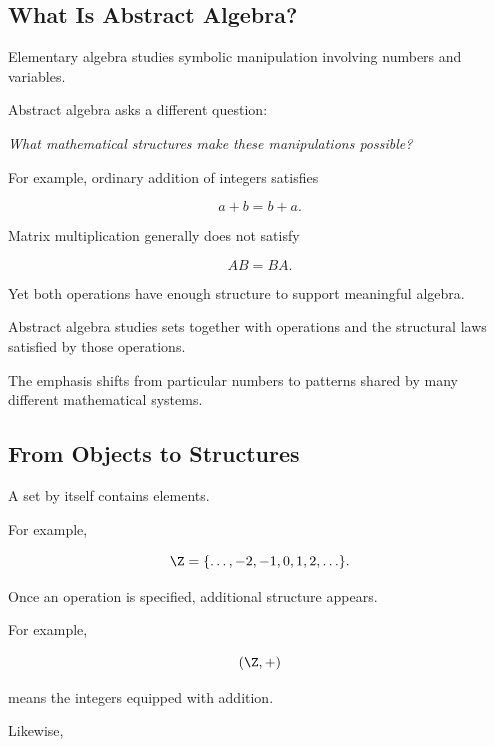 \subsection{What Is Abstract Algebra?}
\label{subsec:what-is-abstract-algebra}

Elementary algebra studies symbolic manipulation involving numbers and
variables.

Abstract algebra asks a different question:

\begin{center}
\emph{What mathematical structures make these manipulations possible?}
\end{center}

For example, ordinary addition of integers satisfies

\[ a+b=b+a. \]

Matrix multiplication generally does not satisfy

\[ AB=BA. \]

Yet both operations have enough structure to support meaningful algebra.

\begin{conceptbox}
Abstract algebra studies sets together with operations and the structural laws
satisfied by those operations.
\end{conceptbox}

The emphasis shifts from particular numbers to patterns shared by many
different mathematical systems.

\subsection{From Objects to Structures}
\label{subsec:objects-to-structures}

A set by itself contains elements.

For example,

\[ \Z=\{\ldots,-2,-1,0,1,2,\ldots\}. \]

Once an operation is specified, additional structure appears.

For example,

\[ (\Z,+) \]

means the integers equipped with addition.

Likewise,

